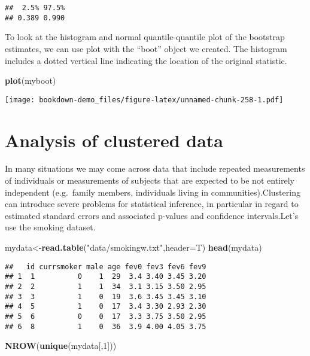 \documentclass[]{book}
\newenvironment{Shaded}{\begin{snugshade}}{\end{snugshade}}
\newcommand{\KeywordTok}[1]{\textcolor[rgb]{0.13,0.29,0.53}{\textbf{#1}}}
\newcommand{\DataTypeTok}[1]{\textcolor[rgb]{0.13,0.29,0.53}{#1}}
\newcommand{\DecValTok}[1]{\textcolor[rgb]{0.00,0.00,0.81}{#1}}
\newcommand{\StringTok}[1]{\textcolor[rgb]{0.31,0.60,0.02}{#1}}
\newcommand{\NormalTok}[1]{#1}
\theoremstyle{definition}
\theoremstyle{definition}
\theoremstyle{definition}
\theoremstyle{remark}
\begin{document}
\begin{verbatim}
##  2.5% 97.5% 
## 0.389 0.990
\end{verbatim}

To look at the histogram and normal quantile-quantile plot of the
bootstrap estimates, we can use plot with the ``boot'' object we
created. The histogram includes a dotted vertical line indicating the
location of the original statistic.

\begin{Shaded}
\begin{Highlighting}[]
\KeywordTok{plot}\NormalTok{(myboot)}
\end{Highlighting}
\end{Shaded}

\texttt{[image: bookdown-demo\_files/figure-latex/unnamed-chunk-258-1.pdf]}

\section{Analysis of clustered data}\label{analysis-of-clustered-data}

In many situations we may come across data that include repeated
measurements of individuals or measurements of subjects that are
expected to be not entirely independent (e.g.~family members,
individuals living in communities).Clustering can introduce severe
problems for statistical inference, in particular in regard to estimated
standard errors and associated p-values and confidence intervals.Let's
use the smoking dataset.

\begin{Shaded}
\begin{Highlighting}[]
\NormalTok{mydata<-}\KeywordTok{read.table}\NormalTok{(}\StringTok{"data/smokingw.txt"}\NormalTok{,}\DataTypeTok{header=}\NormalTok{T)}
\KeywordTok{head}\NormalTok{(mydata)}
\end{Highlighting}
\end{Shaded}

\begin{verbatim}
##   id currsmoker male age fev0 fev3 fev6 fev9
## 1  1          0    1  29  3.4 3.40 3.45 3.20
## 2  2          1    1  34  3.1 3.15 3.50 2.95
## 3  3          1    0  19  3.6 3.45 3.45 3.10
## 4  5          1    0  17  3.4 3.30 2.93 2.30
## 5  6          0    0  17  3.3 3.75 3.50 2.95
## 6  8          1    0  36  3.9 4.00 4.05 3.75
\end{verbatim}

\begin{Shaded}
\begin{Highlighting}[]
\KeywordTok{NROW}\NormalTok{(}\KeywordTok{unique}\NormalTok{(mydata[,}\DecValTok{1}\NormalTok{]))}
\end{Highlighting}
\end{Shaded}
\end{document}
